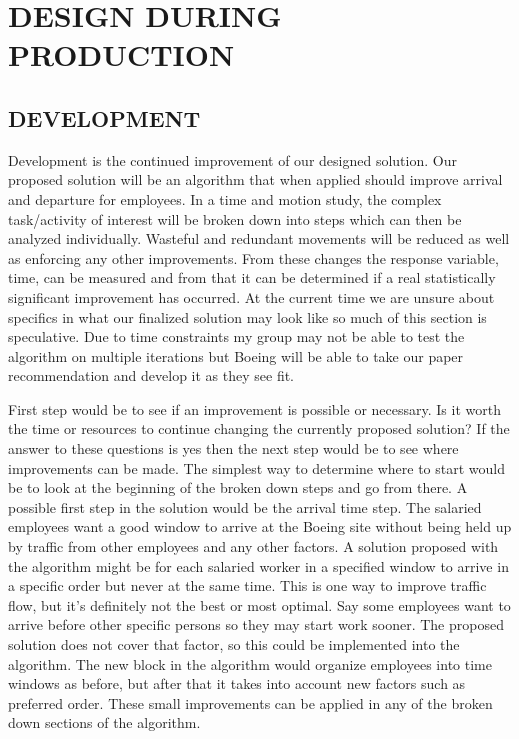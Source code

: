 \documentclass[a4,draftclsnofoot,onecolumn,margin=0.75,10pt]{IEEEtran}
\begin{document}
\clearpage\section[DESIGN DURING PRODUCTION]{\rmfamily\color{black}
DESIGN DURING PRODUCTION}

\subsection[DEVELOPMENT]{\rmfamily\color{black}
DEVELOPMENT}
{\color{black}
Development is the continued improvement of our designed solution. Our proposed solution will be an algorithm that when applied should improve arrival and departure for employees. In a time and motion study, the complex task/activity of interest will be broken down into steps which can then be analyzed individually. Wasteful and redundant movements will be reduced as well as enforcing any other improvements. From these changes the response variable, time, can be measured and from that it can be determined if a real statistically significant improvement has occurred. At the current time we are unsure about specifics in what our finalized solution may look like so much of this section is speculative. Due to time constraints my group may not be able to test the algorithm on multiple iterations but Boeing will be able to take our paper recommendation and develop it as they see fit.

First step would be to see if an improvement is possible or necessary. Is it worth the time or resources to continue changing the currently proposed solution? If the answer to these questions is yes then the next step would be to see where improvements can be made. The simplest way to determine where to start would be to look at the beginning of the broken down steps and go from there. A possible first step in the solution would be the arrival time step. The salaried employees want a good window to arrive at the Boeing site without being held up by traffic from other employees and any other factors. A solution proposed with the algorithm might be for each salaried worker in a specified window to arrive in a specific order but never at the same time. This is one way to improve traffic flow, but it's definitely not the best or most optimal. Say some employees want to arrive before other specific persons so they may start work sooner. The proposed solution does not cover that factor, so this could be implemented into the algorithm. The new block in the algorithm would organize employees into time windows as before, but after that it takes into account new factors such as preferred order. These small improvements can be applied in any of the broken down sections of the algorithm.

}
\end{document}
